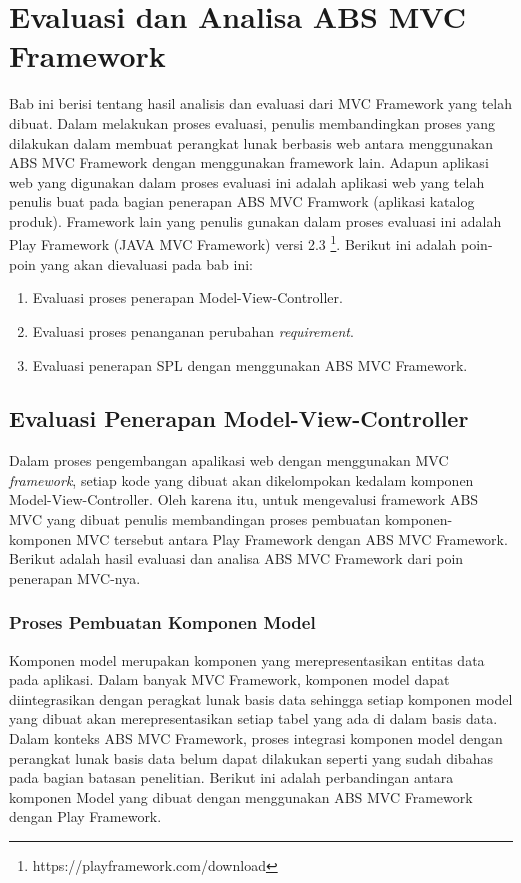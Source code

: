\chapter{Evaluasi dan Analisa ABS MVC Framework}

Bab ini berisi tentang hasil analisis dan evaluasi dari MVC Framework yang telah dibuat. Dalam melakukan proses evaluasi, penulis membandingkan proses yang dilakukan dalam membuat perangkat lunak berbasis web antara menggunakan ABS MVC Framework dengan menggunakan framework lain. Adapun aplikasi web yang digunakan dalam proses evaluasi ini adalah aplikasi web yang telah penulis buat pada bagian penerapan ABS MVC Framwork (aplikasi katalog produk). Framework lain yang penulis gunakan dalam proses evaluasi ini adalah Play Framework (JAVA MVC Framework) versi 2.3 \footnote{https://playframework.com/download}. Berikut ini adalah poin-poin yang akan dievaluasi pada bab ini:

\begin{enumerate}
    \item Evaluasi proses penerapan Model-View-Controller.
    \item Evaluasi proses penanganan perubahan \textit{requirement}.
    \item Evaluasi penerapan SPL dengan menggunakan ABS MVC Framework.
\end{enumerate}

\section{Evaluasi Penerapan Model-View-Controller}

Dalam proses pengembangan apalikasi web dengan menggunakan MVC \textit{framework}, setiap kode yang dibuat akan dikelompokan kedalam komponen Model-View-Controller. Oleh karena itu, untuk mengevalusi framework ABS MVC yang dibuat penulis membandingan proses pembuatan komponen-komponen MVC tersebut antara Play Framework dengan ABS MVC Framework. Berikut adalah hasil evaluasi dan analisa ABS MVC Framework dari poin penerapan MVC-nya.

\subsection{Proses Pembuatan Komponen Model}

Komponen model merupakan komponen yang merepresentasikan entitas data pada aplikasi. Dalam banyak MVC Framework, komponen model dapat diintegrasikan dengan peragkat lunak basis data sehingga setiap komponen model yang dibuat akan merepresentasikan setiap tabel yang ada di dalam basis data. Dalam konteks ABS MVC Framework, proses integrasi komponen model dengan perangkat lunak basis data belum dapat dilakukan seperti yang sudah dibahas pada bagian batasan penelitian. Berikut ini adalah perbandingan antara komponen Model yang dibuat dengan menggunakan ABS MVC Framework dengan Play Framework.

